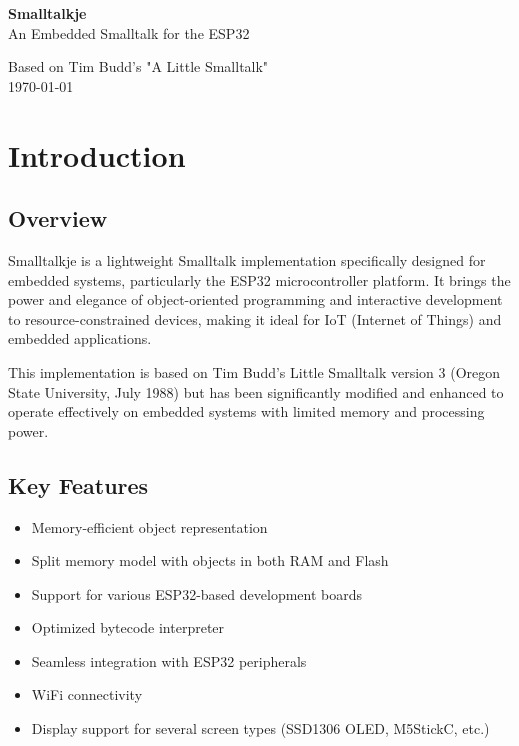 \documentclass[12pt,a4paper]{report}
\begin{document}
\begin{titlepage}
    \centering
    \vspace*{1cm}
    {\Huge\bfseries Smalltalkje\\}
    \vspace{1.5cm}
    {\LARGE An Embedded Smalltalk for the ESP32\\}
    \vspace{2cm}
    
    
    \vspace{2cm}
    {\Large Based on Tim Budd's "A Little Smalltalk"\\}
    \vspace{1.5cm}
    {\large \today\\}
\end{titlepage}

\tableofcontents
\newpage

\chapter{Introduction}

\section{Overview}
Smalltalkje is a lightweight Smalltalk implementation specifically designed for embedded systems, particularly the ESP32 microcontroller platform. It brings the power and elegance of object-oriented programming and interactive development to resource-constrained devices, making it ideal for IoT (Internet of Things) and embedded applications.

This implementation is based on Tim Budd's Little Smalltalk version 3 (Oregon State University, July 1988) but has been significantly modified and enhanced to operate effectively on embedded systems with limited memory and processing power.

\section{Key Features}
\begin{itemize}
    \item Memory-efficient object representation
    \item Split memory model with objects in both RAM and Flash
    \item Support for various ESP32-based development boards
    \item Optimized bytecode interpreter
    \item Seamless integration with ESP32 peripherals
    \item WiFi connectivity
    \item Display support for several screen types (SSD1306 OLED, M5StickC, etc.)
\end{itemize}
\end{document}

